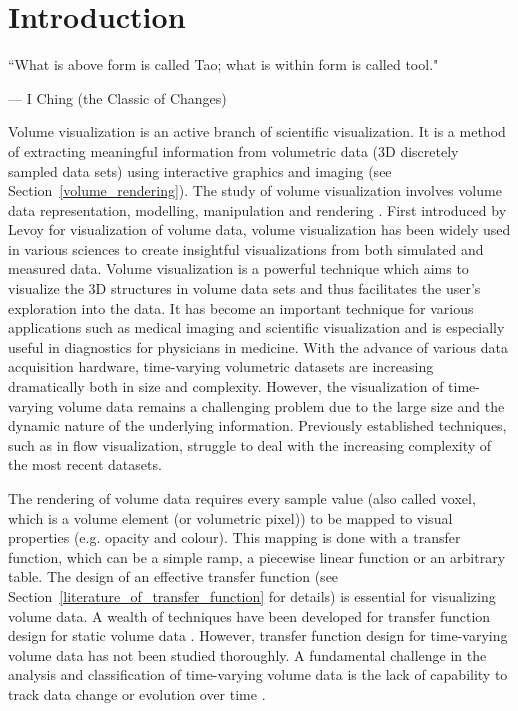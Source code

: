 \chapter{Introduction \label{section_introduction}}
\epigraph{``What is above form is called Tao; what is within form is called tool."}{--- \textup{I Ching (the Classic of Changes)}}

Volume visualization is an active branch of scientific visualization. It is a method of extracting meaningful information from volumetric data (3D discretely sampled data sets) using interactive graphics and imaging (see Section~\ref{volume_rendering}). The study of volume visualization involves volume data representation, modelling, manipulation and rendering \cite{kaufman_volume_1997}.
First introduced by Levoy \cite{levoy_display_1988} for visualization of volume data, volume visualization has been widely used in various sciences to create insightful visualizations from both simulated and measured data.
Volume visualization is a powerful technique which aims to visualize the 3D structures in volume data sets and thus facilitates the user's exploration into the data. It has become an important technique for various applications such as medical imaging and scientific visualization and is especially useful in diagnostics for physicians in medicine.
With the advance of various data acquisition hardware,
time-varying volumetric datasets are increasing dramatically both in size and complexity. However, the visualization of time-varying volume data remains a challenging problem due to the large size and the dynamic nature of the underlying information.
Previously established techniques, such as in flow visualization, struggle to deal with the increasing complexity of the most recent datasets.

The rendering of volume data requires every sample value (also called voxel, which is a volume element (or volumetric pixel)) to be mapped to visual properties (e.g. opacity and colour). This mapping is done with a transfer function, which can be a simple ramp, a piecewise linear function or an arbitrary table.
The design of an effective transfer function (see Section~\ref{literature_of_transfer_function} for details) is essential for visualizing volume data. A wealth of techniques have been developed for transfer function design for static volume data \cite{kindlmann_semi-automatic_1998} \cite{pfister_transfer_2001} \cite{kniss_multidimensional_2002} \cite{bernardon_transfer-function_2008} \cite{arens_survey_2010}. However, transfer function design for time-varying volume data has not been studied thoroughly. %
A fundamental challenge in the analysis and classification of time-varying volume data is the lack of capability to %
track data change or evolution over time \cite{gu_transgraph_2011}.

